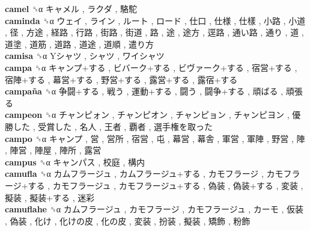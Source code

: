 \textbf{camel} ␝α   キャメル ,  ラクダ ,  駱駝   \\
\textbf{caminda} ␝α   ウェイ ,  ライン ,  ルート ,  ロード ,  仕口 ,  仕様 ,  仕樣 ,  小路 ,  小道 ,  径 ,  方途 ,  経路 ,  行路 ,  街路 ,  街道 ,  路 ,  途 ,  途方 ,  逕路 ,  通い路 ,  通り ,  道 ,  道塗 ,  道筋 ,  道路 ,  道途 ,  道順 ,  遣り方   \\
\textbf{camisa} ␝α   Yシャツ ,  シャツ ,  ワイシャツ   \\
\textbf{campa} ␝α   キャンプ+する ,  ビバーク+する ,  ビヴァーク+する ,  宿営+する ,  宿陣+する ,  幕営+する ,  野営+する ,  露営+する ,  露宿+する   \\
\textbf{campaña} ␝α   争闘+する ,  戦う ,  運動+する ,  闘う ,  闘争+する ,  頑ばる ,  頑張る   \\
\textbf{campeon} ␝α   チャンピォン ,  チャンピオン ,  チャンピョン ,  チャンピヨン ,  優勝した ,  受賞した ,  名人 ,  王者 ,  覇者 ,  選手権を取った   \\
\textbf{campo} ␝α   キャンプ ,  営 ,  営所 ,  宿営 ,  屯 ,  幕営 ,  幕舎 ,  軍営 ,  軍陣 ,  野営 ,  陣 ,  陣営 ,  陣屋 ,  陣所 ,  露営   \\
\textbf{campus} ␝α   キャンパス ,  校庭 ,  構内   \\
\textbf{camufla} ␝α   カムフラージュ ,  カムフラージュ+する ,  カモフラージ ,  カモフラージ+する ,  カモフラージュ ,  カモフラージュ+する ,  偽装 ,  偽装+する ,  変装 ,  擬装 ,  擬装+する ,  迷彩   \\
\textbf{camuflahe} ␝α   カムフラージュ ,  カモフラージ ,  カモフラージュ ,  カーモ ,  仮装 ,  偽装 ,  化け ,  化けの皮 ,  化の皮 ,  変装 ,  扮装 ,  擬装 ,  矯飾 ,  粉飾   \\
